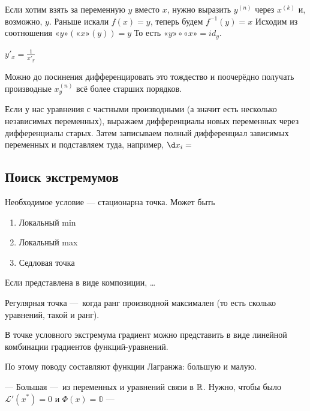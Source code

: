 \documentclass[12pt, a4paper]{article}
\begin{document}
Если хотим взять за переменную $y$ вместо $x$, нужно выразить $y^{(n)}$ через $x^{(k)}$ и, возможно, $y$.
Раньше искали $f(x) = y$, теперь будем $f^{-1}(y) = x$
Исходим из соотношения $«y»(«x»(y)) = y$
То есть $«y» \circ «x» = id_y$.

$y'_x = \frac{1}{x'_y}$

Можно до посинения дифференцировать это тождество 
и поочерёдно получать производные $x^{(n)}_y$ всё более старших порядков.

Если у нас уравнения с частными производными (а значит есть несколько независимых переменных),
выражаем дифференциалы новых переменных через дифференциалы старых. 
Затем записываем полный дифференциал зависимых переменных и подставляем туда, например, $\d x_i = $

\subsection{Поиск экстремумов}

Необходимое условие — стационарна точка.
Может быть

\begin{enumerate}
  \item Локальный min
  \item Локальный max
  \item Седловая точка
\end{enumerate}

Если представлена в виде композиции, …

Регулярная точка — когда ранг производной максимален (то есть сколько уравнений, такой и ранг).

В точке условного экстремума градиент можно представить 
в виде линейной комбинации градиентов функций-уравнений.

По этому поводу составляют функции Лагранжа: большую и малую.

— Большая — из переменных и уравнений связи в ${\mathbb{R}}$. Нужно, чтобы было $\mathcal{L}'(x^*) = 0$ и $\Phi(x) = \mathbb{0}$
— 
\end{document}
